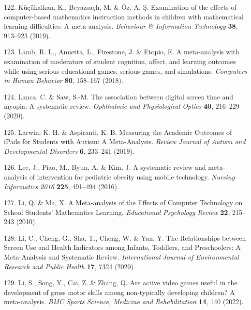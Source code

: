 \documentclass[
  english,
  man]{apa6}
\newenvironment{cslreferences}%
  {}%
  {\par}
\begin{document}
\begin{cslreferences}
\leavevmode\hypertarget{ref-kucukalkanExaminationEffectsComputerbased2019}{}%
122. Küçükalkan, K., Beyazsaçlı, M. \& Öz, A. Ş. Examination of the effects of computer-based mathematics instruction methods in children with mathematical learning difficulties: A meta-analysis. \emph{Behaviour \& Information Technology} \textbf{38}, 913--923 (2019).

\leavevmode\hypertarget{ref-lambMetaanalysisExaminationModerators2018}{}%
123. Lamb, R. L., Annetta, L., Firestone, J. \& Etopio, E. A meta-analysis with examination of moderators of student cognition, affect, and learning outcomes while using serious educational games, serious games, and simulations. \emph{Computers in Human Behavior} \textbf{80}, 158--167 (2018).

\leavevmode\hypertarget{ref-lancaAssociationDigitalScreen2020}{}%
124. Lanca, C. \& Saw, S.-M. The association between digital screen time and myopia: A systematic review. \emph{Ophthalmic and Physiological Optics} \textbf{40}, 216--229 (2020).

\leavevmode\hypertarget{ref-larwinMeasuringAcademicOutcomes2019}{}%
125. Larwin, K. H. \& Aspiranti, K. B. Measuring the Academic Outcomes of iPads for Students with Autism: A Meta-Analysis. \emph{Review Journal of Autism and Developmental Disorders} \textbf{6}, 233--241 (2019).

\leavevmode\hypertarget{ref-leeSystematicReviewMetaanalysis2016}{}%
126. Lee, J., Piao, M., Byun, A. \& Kim, J. A systematic review and meta-analysis of intervention for pediatric obesity using mobile technology. \emph{Nursing Informatics 2016} \textbf{225}, 491--494 (2016).

\leavevmode\hypertarget{ref-liMetaanalysisEffectsComputer2010}{}%
127. Li, Q. \& Ma, X. A Meta-analysis of the Effects of Computer Technology on School Students' Mathematics Learning. \emph{Educational Psychology Review} \textbf{22}, 215--243 (2010).

\leavevmode\hypertarget{ref-liRelationshipsScreenUse2020}{}%
128. Li, C., Cheng, G., Sha, T., Cheng, W. \& Yan, Y. The Relationships between Screen Use and Health Indicators among Infants, Toddlers, and Preschoolers: A Meta-Analysis and Systematic Review. \emph{International Journal of Environmental Research and Public Health} \textbf{17}, 7324 (2020).

\leavevmode\hypertarget{ref-liAreActiveVideo2022}{}%
129. Li, S., Song, Y., Cai, Z. \& Zhang, Q. Are active video games useful in the development of gross motor skills among non-typically developing children? A meta-analysis. \emph{BMC Sports Science, Medicine and Rehabilitation} \textbf{14}, 140 (2022).


\end{cslreferences}
\end{document}
